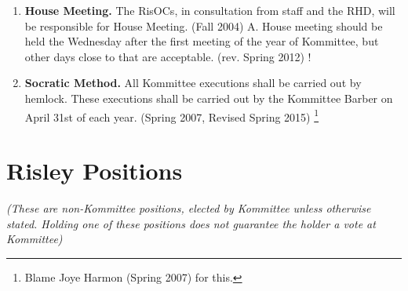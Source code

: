 \documentclass[12pt]{article}
\begin{document}
\begin{enumerate}[1.]
\item \textbf{House Meeting.} The RisOCs, in consultation from staff and the RHD, will be responsible for House Meeting. (Fall 2004) A. House meeting should be held the Wednesday after the first meeting of the year of Kommittee, but other days close to that are acceptable. (rev. Spring 2012) !
\item \textbf{Socratic Method.} All Kommittee executions shall be carried out by hemlock.  These executions shall be carried out by the Kommittee Barber on April 31st of each year. (Spring 2007, Revised Spring 2015) \footnote{Blame Joye Harmon (Spring 2007) for this.}
\end{enumerate}
\section*{Risley Positions}
\begin{center}\textit{(These are non-Kommittee positions, elected by Kommittee unless otherwise stated. Holding one of these positions does not guarantee the holder a vote at Kommittee)}
\end{center}
\end{document}

